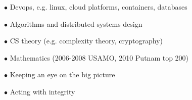 \documentclass[11 pt]{article}
\begin{document}
$\bullet$ Devops, e.g. linux, cloud platforms, containers, databases %

$\bullet$ Algorithms and distributed systems design

$\bullet$ CS theory (e.g. complexity theory, cryptography) %

$\bullet$ Mathematics (2006-2008 USAMO, 2010 Putnam top 200)


$\bullet$ Keeping an eye on the big picture

$\bullet$ Acting with integrity




\end{document}

